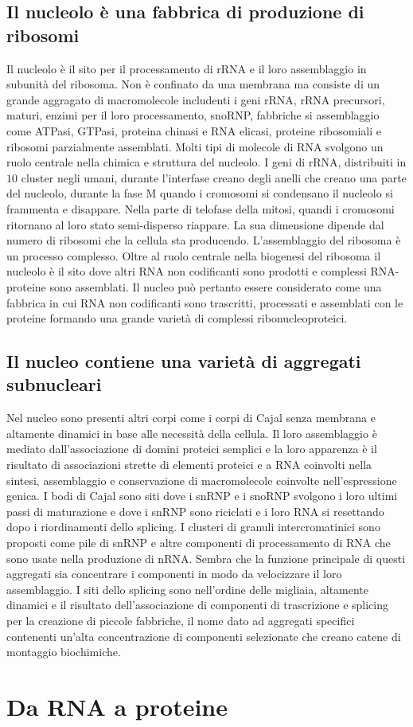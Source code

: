 \subsection{Il nucleolo \`e una fabbrica di produzione di ribosomi}
Il nucleolo \`e il sito per il processamento di rRNA e il loro assemblaggio in subunit\`a del ribosoma. Non \`e confinato da una membrana ma consiste di un grande aggragato di 
macromolecole includenti i geni rRNA, rRNA precursori, maturi, enzimi per il loro processamento, snoRNP, fabbriche si assemblaggio come ATPasi, GTPasi, proteina chinasi e RNA elicasi, 
proteine ribosomiali e ribosomi parzialmente assemblati. Molti tipi di molecole di RNA svolgono un ruolo centrale nella chimica e struttura del nucleolo. I geni di rRNA, distribuiti in
$10$ cluster negli umani, durante l'interfase creano degli anelli che creano una parte del nucleolo, durante la fase M quando i cromosomi si condensano il nucleolo si frammenta e 
disappare. Nella parte di telofase della mitosi, quandi i cromosomi ritornano al loro stato semi-disperso riappare. La sua dimensione dipende dal numero di ribosomi che la cellula sta
producendo. L'assemblaggio del ribosoma \`e un processo complesso. Oltre al ruolo centrale nella biogenesi del ribosoma il nucleolo \`e il sito dove altri RNA non codificanti sono
prodotti e complessi RNA-proteine sono assemblati. Il nucleo pu\`o pertanto essere considerato come una fabbrica in cui RNA non codificanti sono trascritti, processati e assemblati con
le proteine formando una grande variet\`a di complessi ribonucleoproteici. 
\subsection{Il nucleo contiene una variet\`a di aggregati subnucleari}
Nel nucleo sono presenti altri corpi come i corpi di Cajal senza membrana e altamente dinamici in base alle necessit\`a della cellula. Il loro assemblaggio \`e mediato dall'associazione
di domini proteici semplici e la loro apparenza \`e il risultato di associazioni strette di elementi proteici e a RNA coinvolti nella sintesi, assemblaggio e conservazione di 
macromolecole coinvolte nell'espressione genica. I bodi di Cajal sono siti dove i snRNP e i snoRNP svolgono i loro ultimi passi di maturazione e dove i snRNP sono riciclati e i loro RNA
si resettando dopo i riordinamenti dello splicing. I clusteri di granuli intercromatinici sono proposti come pile di snRNP e altre componenti di processamento di RNA che sono 
usate nella produzione di nRNA. Sembra che la funzione principale di questi aggregati sia concentrare i componenti in modo da velocizzare il loro assemblaggio. I siti dello splicing
sono nell'ordine delle migliaia, altamente dinamici e il risultato dell'associazione di componenti di trascrizione e splicing per la creazione di piccole fabbriche, il nome dato ad
aggregati specifici contenenti un'alta concentrazione di componenti selezionate che creano catene di montaggio biochimiche. 
\section{Da RNA a proteine}
